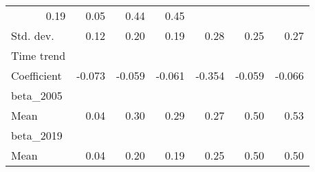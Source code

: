 \begin{tabular}{lllllll}
  \multicolumn{1}{r}{0.19} &
  \multicolumn{1}{r}{0.05} &
  \multicolumn{1}{r}{0.44} &
  \multicolumn{1}{r}{0.45} \\
\multicolumn{1}{l}{\hspace{1em}Std. dev.} &
  \multicolumn{1}{|r}{0.12} &
  \multicolumn{1}{r}{0.20} &
  \multicolumn{1}{r}{0.19} &
  \multicolumn{1}{r}{0.28} &
  \multicolumn{1}{r}{0.25} &
  \multicolumn{1}{r}{0.27} \\
\multicolumn{1}{l}{Time trend} &
  \multicolumn{1}{|r}{} &
  \multicolumn{1}{r}{} &
  \multicolumn{1}{r}{} &
  \multicolumn{1}{r}{} &
  \multicolumn{1}{r}{} &
  \multicolumn{1}{r}{} \\
\multicolumn{1}{l}{\hspace{1em}Coefficient} &
  \multicolumn{1}{|r}{-0.073} &
  \multicolumn{1}{r}{-0.059} &
  \multicolumn{1}{r}{-0.061} &
  \multicolumn{1}{r}{-0.354} &
  \multicolumn{1}{r}{-0.059} &
  \multicolumn{1}{r}{-0.066} \\
\multicolumn{1}{l}{beta\_2005} &
  \multicolumn{1}{|r}{} &
  \multicolumn{1}{r}{} &
  \multicolumn{1}{r}{} &
  \multicolumn{1}{r}{} &
  \multicolumn{1}{r}{} &
  \multicolumn{1}{r}{} \\
\multicolumn{1}{l}{\hspace{1em}Mean} &
  \multicolumn{1}{|r}{0.04} &
  \multicolumn{1}{r}{0.30} &
  \multicolumn{1}{r}{0.29} &
  \multicolumn{1}{r}{0.27} &
  \multicolumn{1}{r}{0.50} &
  \multicolumn{1}{r}{0.53} \\
\multicolumn{1}{l}{beta\_2019} &
  \multicolumn{1}{|r}{} &
  \multicolumn{1}{r}{} &
  \multicolumn{1}{r}{} &
  \multicolumn{1}{r}{} &
  \multicolumn{1}{r}{} &
  \multicolumn{1}{r}{} \\
\multicolumn{1}{l}{\hspace{1em}Mean} &
  \multicolumn{1}{|r}{0.04} &
  \multicolumn{1}{r}{0.20} &
  \multicolumn{1}{r}{0.19} &
  \multicolumn{1}{r}{0.25} &
  \multicolumn{1}{r}{0.50} &
  \multicolumn{1}{r}{0.50} \\
\cline{1-7}
\end{tabular}
